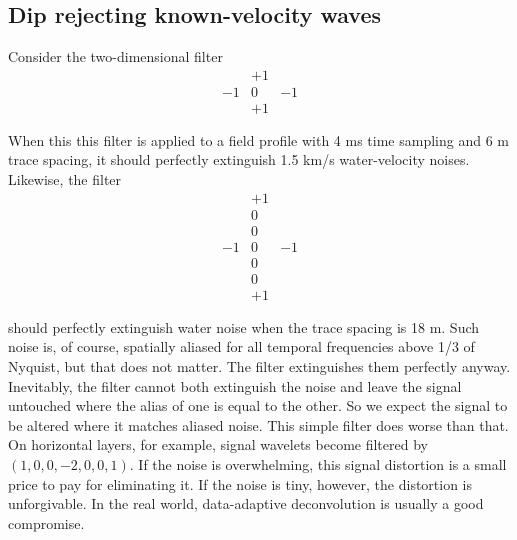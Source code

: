 \subsection{Dip rejecting known-velocity waves}
Consider the two-dimensional filter
\begin{equation}
   \begin{array}{rrr}
      \     & +1 & \     \\
        -1  &  0 &  -1   \\
      \     & +1 & \     
      \end{array}
\end{equation}

\noindent
When this this filter is applied to a field profile
with 4 ms time sampling and 6 m trace spacing,
it should perfectly extinguish
1.5 km/s water-velocity noises.
Likewise, the filter
\begin{equation}
   \begin{array}{rrr}
      \  &  +1  &  \    \\
      \  &   0  &  \    \\
      \  &   0  &  \    \\
      -1 &   0  &  -1   \\
      \  &   0  &  \    \\
      \  &   0  &  \    \\
      \  &  +1  &  \   
      \end{array}
\end{equation}


\noindent
should perfectly extinguish water noise
when the trace spacing is 18 m.
Such noise is, of course, spatially aliased
for all temporal frequencies above 1/3 of Nyquist,
but that does not matter.
The filter extinguishes them perfectly anyway.
Inevitably, the filter cannot both extinguish the noise
and leave the signal untouched where the alias of one is equal to the other.
So we expect the signal to be altered where it matches aliased noise.
This simple filter does worse than that.
On horizontal layers, for example,
signal wavelets become filtered by $(1,0,0,-2,0,0,1)$.
If the noise is overwhelming,
this signal distortion is a small price to pay
for eliminating it.
If the noise is tiny, however, the distortion is unforgivable.
In the real world,
data-adaptive deconvolution is usually a good compromise.

